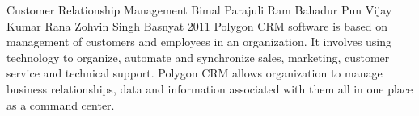 \begin{conf-abstract}[]
{Customer Relationship Management}
{ 
Bimal Parajuli
Ram Bahadur Pun
Vijay Kumar Rana
Zohvin Singh Basnyat
}
{2011}
Polygon CRM software is based on management of customers and employees in an organization. It involves using technology to organize, automate and synchronize sales, marketing, customer service and technical support. Polygon CRM allows organization to manage business relationships, data and information associated with them all in one place as a command center.
\end{conf-abstract}